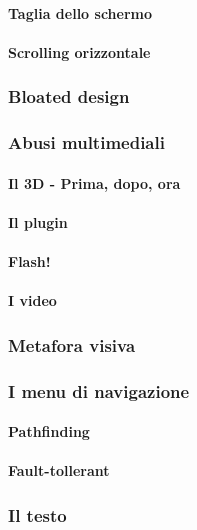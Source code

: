 			\paragraph{Taglia dello schermo}
			\paragraph{Scrolling orizzontale}
		
		\subsubsection{Bloated design}
		
		\subsubsection{Abusi multimediali}
			\paragraph{Il 3D - Prima, dopo, ora}
			\paragraph{Il plugin}
			\paragraph{Flash!}
			\paragraph{I video}
		
		\subsubsection{Metafora visiva}
		
		\subsubsection{I menu di navigazione}
			\paragraph{Pathfinding}
			\paragraph{Fault-tollerant}
			
		\subsubsection{Il testo}
			
